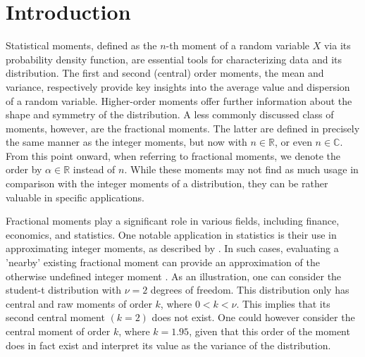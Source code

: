 \section{Introduction}\label{s:intro}
Statistical moments, defined as the \(n\)-th moment of a random variable \(X\) via its probability density function, are essential tools for characterizing data and its distribution. The first and second (central) order moments, the mean and variance, respectively provide key insights into the average value and dispersion of a random variable. Higher-order moments offer further information about the shape and symmetry of the distribution. A less commonly discussed class of moments, however, are the fractional moments. The latter are defined in precisely the same manner as the integer moments, but now with \(n \in \mathbb{R}\), or even \(n \in \mathbb{C}\). From this point onward, when referring to fractional moments, we denote the order by \(\alpha \in \mathbb{R}\) instead of \(n\). While these moments may not find as much usage in comparison with the integer moments of a distribution, they can be rather valuable in specific applications.

Fractional moments play a significant role in various fields, including finance, economics, and statistics. One notable application in statistics is their use in approximating integer moments, as described by \citet{inverardi2024}. In such cases, evaluating a 'nearby' existing fractional moment can provide an approximation of the otherwise undefined integer moment \citep{inverardi2024}. As an illustration, one can consider the student-t distribution with \(\nu = 2\) degrees of freedom. This distribution only has central and raw moments of order \(k\), where \( 0 < k < \nu\). This implies that its second central moment \((k = 2)\) does not exist. One could however consider the central moment of order \(k\), where \(k = 1.95\), given that this order of the moment does in fact exist and interpret its value as the variance of the distribution. 

